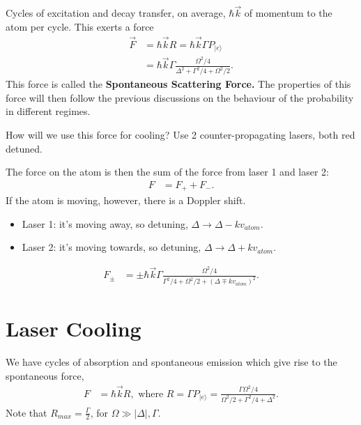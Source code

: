 \documentclass[a4paper, 11pt, normalem]{report}
\begin{document}
Cycles of excitation and decay transfer, on average, $\hbar\vec{k}$ of momentum to the atom per cycle.
This exerts a force
\begin{align}
    \vec{F} &= \hbar\vec{k}R = \hbar\vec{k}\Gamma P_{|e\rangle} \\
            &= \hbar\vec{k}\Gamma\frac{\Omega^2/4}{\Delta^2+\Gamma^2/4+\Omega^2/2}.
\end{align}
This force is called the \textbf{Spontaneous Scattering Force.}
The properties of this force will then follow the previous discussions on the behaviour of the probability in different regimes.

How will we use this force for cooling?
Use 2 counter-propagating lasers, both red detuned.
\begin{figure}[H]
    \centering
\end{figure}
The force on the atom is then the sum of the force from laser 1 and laser 2:
\begin{align}
    F &= F_+ + F_-.
\end{align}
If the atom is moving, however, there is a Doppler shift.
\begin{itemize}
    \item Laser 1: it's moving away, so detuning, $\Delta\to\Delta-kv_{atom}$.
    \item Laser 2: it's moving towards, so detuning, $\Delta\to\Delta+kv_{atom}$.
\end{itemize}
\begin{align}
    F_{\pm} &= \pm \hbar\vec{k}\Gamma\frac{\Omega^2/4}{\Gamma^2/4 + \Omega^2/2 + (\Delta\mp kv_{atom})^2}.
\end{align}

\chapter{Laser Cooling}
We have cycles of absorption and spontaneous emission which give rise to the spontaneous force,
\begin{align}
    F &= \hbar\vec{k}R, \text{ where } R = \Gamma P_{|e\rangle} = \frac{\Gamma\Omega^2/4}{\Omega^2/2 + \Gamma^2/4 + \Delta^2}.
\end{align}
Note that $R_{max}=\frac{\Gamma}{2}$, for $\Omega\gg|\Delta|,\Gamma$.
\end{document}
